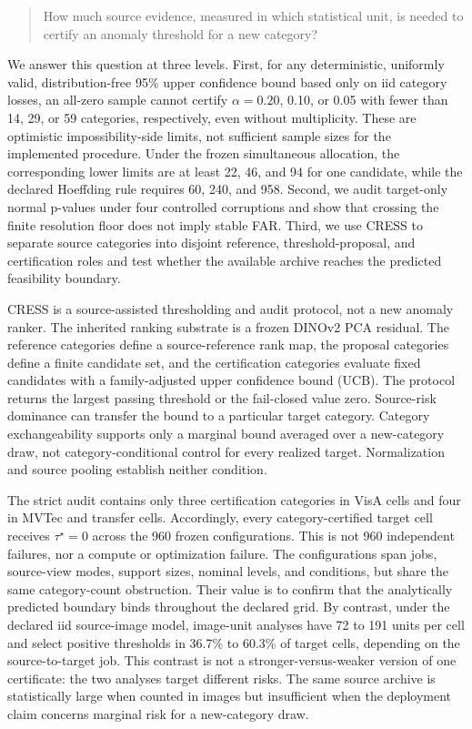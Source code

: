 \begin{quote}
How much source evidence, measured in which statistical unit, is needed to certify an anomaly threshold for a new category?
\end{quote}

We answer this question at three levels. First, for any deterministic, uniformly valid, distribution-free 95\% upper confidence bound based only on iid category losses, an all-zero sample cannot certify $\alpha=0.20$, 0.10, or 0.05 with fewer than 14, 29, or 59 categories, respectively, even without multiplicity. These are optimistic impossibility-side limits, not sufficient sample sizes for the implemented procedure. Under the frozen simultaneous allocation, the corresponding lower limits are at least 22, 46, and 94 for one candidate, while the declared Hoeffding rule requires 60, 240, and 958. Second, we audit target-only normal p-values under four controlled corruptions and show that crossing the finite resolution floor does not imply stable FAR. Third, we use CRESS to separate source categories into disjoint reference, threshold-proposal, and certification roles and test whether the available archive reaches the predicted feasibility boundary.

CRESS is a source-assisted thresholding and audit protocol, not a new anomaly ranker. The inherited ranking substrate is a frozen DINOv2 PCA residual. The reference categories define a source-reference rank map, the proposal categories define a finite candidate set, and the certification categories evaluate fixed candidates with a family-adjusted upper confidence bound (UCB). The protocol returns the largest passing threshold or the fail-closed value zero. Source-risk dominance can transfer the bound to a particular target category. Category exchangeability supports only a marginal bound averaged over a new-category draw, not category-conditional control for every realized target. Normalization and source pooling establish neither condition.

The strict audit contains only three certification categories in VisA cells and four in MVTec and transfer cells. Accordingly, every category-certified target cell receives $\tau^\star=0$ across the 960 frozen configurations. This is not 960 independent failures, nor a compute or optimization failure. The configurations span jobs, source-view modes, support sizes, nominal levels, and conditions, but share the same category-count obstruction. Their value is to confirm that the analytically predicted boundary binds throughout the declared grid. By contrast, under the declared iid source-image model, image-unit analyses have 72 to 191 units per cell and select positive thresholds in 36.7\% to 60.3\% of target cells, depending on the source-to-target job. This contrast is not a stronger-versus-weaker version of one certificate: the two analyses target different risks. The same source archive is statistically large when counted in images but insufficient when the deployment claim concerns marginal risk for a new-category draw.

